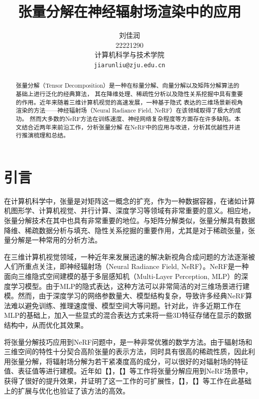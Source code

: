 \documentclass[10pt,twocolumn,letterpaper]{article}
\begin{document}
\title{张量分解在神经辐射场渲染中的应用}

\author{刘佳润\\
    22221290\\
    计算机科学与技术学院\\
    {\tt\small jiarunliu@zju.edu.cn}
}
\maketitle

\begin{abstract}
  张量分解（Tensor Decomposition）是一种在标量分解、向量分解以及矩阵分解算法的基础上进行泛化的经典算法，
  其在降维处理、稀疏性分析以及隐性关系挖掘中具有重要的作用。近年来随着三维计算机视觉的高速发展，一种基于隐式
  表达的三维场景新视角渲染的方法——神经辐射场（Neural Radiance Field, NeRF）在该领域取得了极大的成功。
  然而大多数的NeRF方法在训练速度、神经网络复杂程度等方面存在许多缺陷。本文结合近两年来前沿工作，分析张量分解
  在NeRF中的应用与改进，分析其优越性并进行推演梳理和总结。
\end{abstract}

\section{引言}
\label{sec:intro}
在计算机科学中，张量是对矩阵这一概念的扩充，作为一种数据容器，在诸如计算机图形学、计算机视觉、并行计算、深度学习等领域有非常重要的意义。相应地，张量分解技术在其中也具有非常重要的地位。与矩阵分解类似，张量分解具有数据降维、稀疏数据分析与填充、隐性关系挖掘的重要作用，尤其是对于稀疏张量，张量分解是一种常用的分析方法。

在三维计算机视觉领域，一种近年来发展迅速的解决新视角合成问题的方法逐渐被人们所重点关注，即神经辐射场（Neural Radiance Field, NeRF）。NeRF是一种面向三维隐式空间建模的基于多层感知机（Multi-Layer Perception, MLP）的深度学习模型。由于MLP的隐式表达，这种方法可以非常简洁的对三维场景进行建模。然而，由于深度学习的网络参数量大、模型结构复杂，导致许多经典NeRF算法难以避免训练、推理速度慢、模型空间大等问题。针对此，许多近期工作在MLP的基础上，加入一些显式的混合表达方式来将一些3D特征存储在显示的数据结构中，从而优化其效果。

将张量分解技巧应用到NeRF问题中，是一种非常优雅的数学方法。由于辐射场和三维空间的特性十分契合高阶张量的表示方法，同时具有很高的稀疏性质，因此利用张量分解，将辐射场分解为若干紧凑度高的成分，可以很好的对辐射场的特征值、表征值等进行建模。近年如【】，【】等工作将张量分解应用到NeRF场景中，获得了很好的提升效果，并证明了这一工作的可扩展性，【】，【】等工作在此基础上的扩展与优化也验证了该方法的高效。
\end{document}
